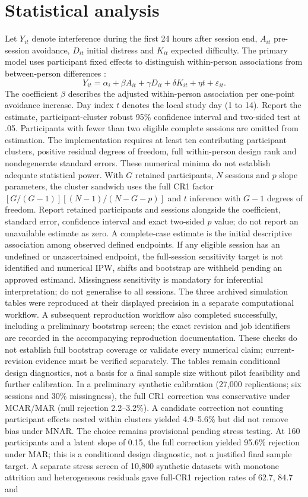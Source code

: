\documentclass[11pt]{article}
\begin{document}
\section{Statistical analysis}
Let $Y_{it}$ denote interference during the first 24 hours after session end, $A_{it}$ pre-session avoidance, $D_{it}$ initial distress and $K_{it}$ expected difficulty. The primary model uses participant fixed effects to distinguish within-person associations from between-person differences \citep{curran2011}:
\[
Y_{it}=\alpha_i+\beta A_{it}+\gamma D_{it}+\delta K_{it}+\eta t+\varepsilon_{it}.
\]
The coefficient $\beta$ describes the adjusted within-person association per one-point avoidance increase. Day index $t$ denotes the local study day (1 to 14). Report the estimate, participant-cluster robust 95\% confidence interval and two-sided test at .05. Participants with fewer than two eligible complete sessions are omitted from estimation. The implementation requires at least ten contributing participant clusters, positive residual degrees of freedom, full within-person design rank and nondegenerate standard errors. These numerical minima do not establish adequate statistical power. With $G$ retained participants, $N$ sessions and $p$ slope parameters, the cluster sandwich uses the full CR1 factor $[G/(G-1)][(N-1)/(N-G-p)]$ and $t$ inference with $G-1$ degrees of freedom. Report retained participants and sessions alongside the coefficient, standard error, confidence interval and exact two-sided $p$ value; do not report an unavailable estimate as zero. A complete-case estimate is the initial descriptive association among observed defined endpoints. If any eligible session has an undefined or unascertained endpoint, the full-session sensitivity target is not identified and numerical IPW, shifts and bootstrap are withheld pending an approved estimand. Missingness sensitivity is mandatory for inferential interpretation; do not generalise to all sessions. The three archived simulation tables were reproduced at their displayed precision in a separate computational workflow. A subsequent reproduction workflow also completed successfully, including a preliminary bootstrap screen; the exact revision and job identifiers are recorded in the accompanying reproduction documentation. These checks do not establish full bootstrap coverage or validate every numerical claim; current-revision evidence must be verified separately. The tables remain conditional design diagnostics, not a basis for a final sample size without pilot feasibility and further calibration. In a preliminary synthetic calibration (27,000 replications; six sessions and 30\% missingness), the full CR1 correction was conservative under MCAR/MAR (null rejection 2.2--3.2\%). A candidate correction not counting participant effects nested within clusters yielded 4.9--5.6\% but did not remove bias under MNAR. The choice remains provisional pending stress testing. At 160 participants and a latent slope of 0.15, the full correction yielded 95.6\% rejection under MAR; this is a conditional design diagnostic, not a justified final sample target. A separate stress screen of 10,800 synthetic datasets with monotone attrition and heterogeneous residuals gave full-CR1 rejection rates of 62.7, 84.7 and 
\end{document}
